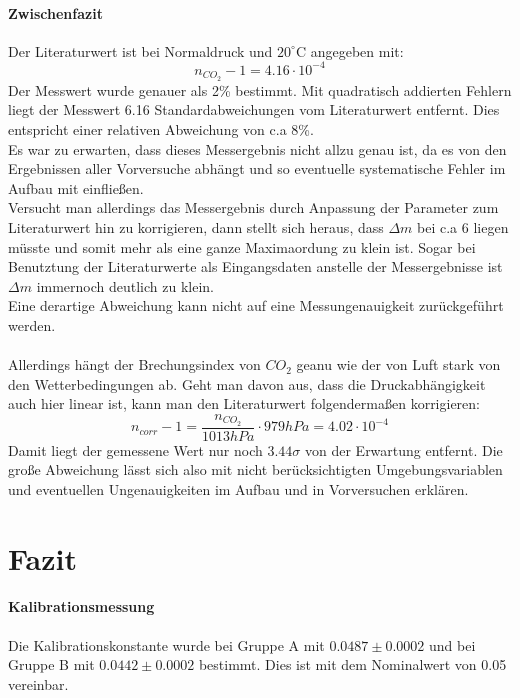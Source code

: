 \documentclass[12pt,a4paper]{article}
\begin{document}
\paragraph{Zwischenfazit}
Der Literaturwert ist bei Normaldruck und $20^\circ \text{C}$ angegeben mit:
\begin{equation}
n_{CO_2}-1 = 4.16\cdot 10^{-4}
\end{equation}
Der Messwert wurde genauer als 2\% bestimmt.
Mit quadratisch addierten Fehlern liegt der Messwert 6.16 Standardabweichungen vom Literaturwert entfernt. Dies entspricht einer relativen Abweichung von c.a 8\%.\\
Es war zu erwarten, dass dieses Messergebnis nicht allzu genau ist, da es von den Ergebnissen aller Vorversuche abhängt und so eventuelle systematische Fehler im Aufbau mit einfließen.\\
Versucht man allerdings das Messergebnis durch Anpassung der Parameter zum Literaturwert hin zu korrigieren, dann stellt sich heraus, dass $\Delta m$ bei c.a 6 liegen müsste und somit mehr als eine ganze Maximaordung zu klein ist. Sogar bei Benutztung der Literaturwerte als Eingangsdaten anstelle der Messergebnisse ist $\Delta m$ immernoch deutlich zu klein.\\
Eine derartige Abweichung kann nicht auf eine Messungenauigkeit zurückgeführt werden.\\ \\
Allerdings hängt der Brechungsindex von $CO_2$ geanu wie der von Luft stark von den Wetterbedingungen ab. Geht man davon aus, dass die Druckabhängigkeit auch hier linear ist, kann man den Literaturwert folgendermaßen korrigieren:
\begin{equation}
n_{corr}-1 = \dfrac{n_{CO_2}}{1013 hPa} \cdot 979 hPa = 4.02\cdot 10^{-4}
\end{equation}
Damit liegt der gemessene Wert nur noch $3.44 \sigma$ von der Erwartung entfernt. Die große Abweichung lässt sich also mit nicht berücksichtigten Umgebungsvariablen und eventuellen Ungenauigkeiten im Aufbau und in Vorversuchen erklären.
\section{Fazit}
\paragraph{Kalibrationsmessung}
Die Kalibrationskonstante wurde bei Gruppe A mit $0.0487\pm 0.0002$ und bei Gruppe B mit $0.0442\pm 0.0002$ bestimmt. Dies ist mit dem Nominalwert von 0.05 vereinbar.
\end{document}
